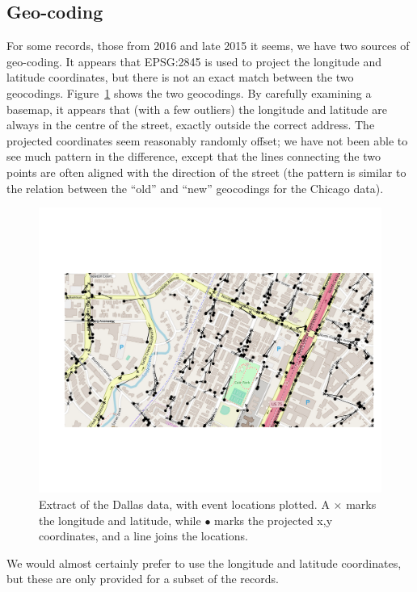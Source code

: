 \documentclass[twoside,a4paper,twocolumn,10pt]{article}
\theoremstyle{plain}
\theoremstyle{definition}
\begin{document}
\subsection{Geo-coding}

For some records, those from 2016 and late 2015 it seems, we have two sources of geo-coding.  It appears that
EPSG:2845 is used to project the longitude and latitude coordinates, but there is not an exact match
between the two geocodings.  Figure~\ref{fig:dallas_geocoding} shows the two geocodings.  By
carefully examining a basemap, it appears that (with a few outliers) the longitude and latitude
are always in the centre of the street, exactly outside the correct address.  The projected coordinates
seem reasonably randomly offset; we have not been able to see much pattern in the difference, except
that the lines connecting the two points are often aligned with the direction of the street (the
pattern is similar to the relation between the ``old'' and ``new'' geocodings for the Chicago data).

\begin{figure}
  \includegraphics[width=\textwidth]{dallas_geocoding_1.png}
  \caption{Extract of the Dallas data, with event locations plotted.  A $\times$ marks the longitude
and latitude, while $\bullet$ marks the projected x,y coordinates, and a line joins the locations.}
  \label{fig:dallas_geocoding}
\end{figure}

We would almost certainly prefer to use the longitude and latitude coordinates, but these are only
provided for a subset of the records.
\end{document}
